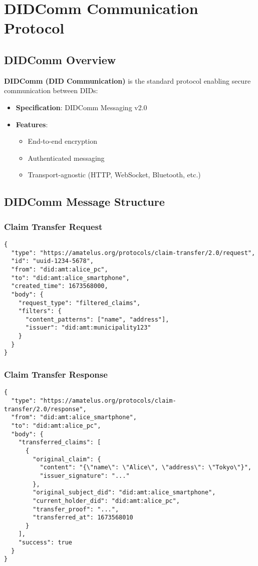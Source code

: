 \section{DIDComm Communication Protocol}

\subsection{DIDComm Overview}

\textbf{DIDComm (DID Communication)} is the standard protocol enabling secure communication between DIDs:

\begin{itemize}
  \item \textbf{Specification}: DIDComm Messaging v2.0
  \item \textbf{Features}:
    \begin{itemize}
      \item End-to-end encryption
      \item Authenticated messaging
      \item Transport-agnostic (HTTP, WebSocket, Bluetooth, etc.)
    \end{itemize}
\end{itemize}

\subsection{DIDComm Message Structure}

\subsubsection{Claim Transfer Request}

\begin{verbatim}
{
  "type": "https://amatelus.org/protocols/claim-transfer/2.0/request",
  "id": "uuid-1234-5678",
  "from": "did:amt:alice_pc",
  "to": "did:amt:alice_smartphone",
  "created_time": 1673568000,
  "body": {
    "request_type": "filtered_claims",
    "filters": {
      "content_patterns": ["name", "address"],
      "issuer": "did:amt:municipality123"
    }
  }
}
\end{verbatim}

\subsubsection{Claim Transfer Response}

\begin{verbatim}
{
  "type": "https://amatelus.org/protocols/claim-transfer/2.0/response",
  "from": "did:amt:alice_smartphone",
  "to": "did:amt:alice_pc",
  "body": {
    "transferred_claims": [
      {
        "original_claim": {
          "content": "{\"name\": \"Alice\", \"address\": \"Tokyo\"}",
          "issuer_signature": "..."
        },
        "original_subject_did": "did:amt:alice_smartphone",
        "current_holder_did": "did:amt:alice_pc",
        "transfer_proof": "...",
        "transferred_at": 1673568010
      }
    ],
    "success": true
  }
}
\end{verbatim}

